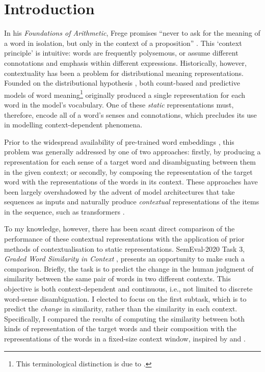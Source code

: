 \section{Introduction}

In his \emph{Foundations of Arithmetic}, Frege promises ``never to ask for the meaning
of a word in isolation, but only in the context of a proposition''
\parencite*[xvii]{Frege1980}.
This `context principle' is intuitive: words are frequently polysemous, or assume
different connotations and emphasis within different expressions.
Historically, however, contextuality has been a problem for distributional meaning
representations.
Founded on the distributional hypothesis \parencites{Harris1954}{Firth1957}, both
count-based and predictive models of word meaning\footnote{ This terminological
  distinction is due to \textcite{Baroni2014a}.
} originally
produced a single representation for each word in the model's vocabulary.
One of these \emph{static} representations must, therefore, encode all of a word's
senses and connotations, which precludes its use in modelling context-dependent
phenomena.

Prior to the widespread availability of pre-trained word embeddings
\parencites[e.g.,][]{Mikolov2013}{Pennington2014}, this problem was generally addressed
by one of two approaches: firstly, by producing a representation for each sense of a
target word and disambiguating between them in the given context; or secondly, by
composing the representation of the target word with the representations of the words
in its context.
These approaches have been largely overshadowed by the advent of model architectures
that take sequences as inputs and naturally produce \emph{contextual} representations
of the items in the sequence, such as transformers \parencite{Vaswani2017}.

To my knowledge, however, there has been scant direct comparison of the performance of
these contextual representations with the application of prior methods of
contextualisation to static representations.
SemEval-2020 Task 3, \emph{Graded Word Similarity in Context}
\parencite{Armendariz2020a}, presents an opportunity to make such a comparison.
Briefly, the task is to predict the change in the human judgment of similarity between
the same pair of words in two different contexts.
This objective is both context-dependent and continuous, i.e., not limited to discrete
word-sense disambiguation.
I elected to focus on the first subtask, which is to predict the \emph{change} in
similarity, rather than the similarity in each context.
Specifically, I compared the results of computing the similarity between both kinds of
representation of the target words and their composition with the representations of
the words in a fixed-size context window, inspired by \textcite{Kintsch2001} and
\textcite{Mitchell2008}.

